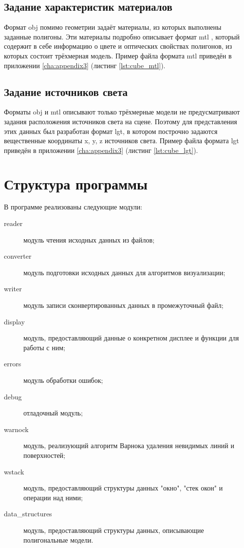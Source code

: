 \subsection{Задание характеристик материалов}
Формат obj помимо геометрии задаёт материалы, из которых выполнены заданные полигоны. Эти материалы подробно описывает формат 
mtl \cite{mtl}, который содержит в себе информацию о цвете и оптических свойствах полигонов, из которых состоит трёхмерная модель. 
Пример файла формата mtl приведён в приложении \ref{cha:appendix3} (листинг \ref{lst:cube_mtl}).

\subsection{Задание источников света}
Форматы obj и mtl описывают только трёхмерные модели не предусматривают задания расположения источников света на сцене. Поэтому 
для представления этих данных был разработан формат lgt, в котором построчно задаются вещественные координаты x, y, z источников света. 
Пример файла формата lgt приведён в приложении \ref{cha:appendix3} (листинг \ref{lst:cube_lgt}).



\section{Структура программы}
В программе реализованы следующие модули:
\begin{description}
	\item[reader] модуль чтения исходных данных из файлов;
	\item[converter] модуль подготовки исходных данных для алгоритмов визуализации;
	\item[writer] модуль записи сконвертированных данных в промежуточный файл;
	\item[display] модуль, предоставляющий данные о конкретном дисплее и функции для работы с ним;
	\item[errors] модуль обработки ошибок;
	\item[debug] отладочный модуль;
	\item[warnock] модуль, реализующий алгоритм Варнока удаления невидимых линий и поверхностей;
	\item[wstack] модуль, предоставляющий структуры данных "окно"{}, "стек окон"{} и операции над ними;
	\item[data\_structures] модуль, предоставляющий структуры данных, описывающие полигональные модели.
\end{description}

